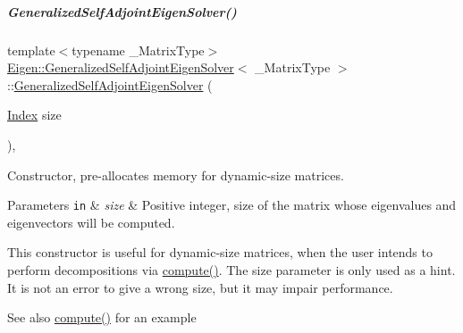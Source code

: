 \mbox{\label{group___eigenvalues___module_aac849f01a8c6148c645acd10bd3a9b0e}} 
\subparagraph{\texorpdfstring{Generalized\+Self\+Adjoint\+Eigen\+Solver()}{GeneralizedSelfAdjointEigenSolver()}\hspace{0.1cm}{\footnotesize\ttfamily [2/6]}}
{\footnotesize\ttfamily template$<$typename \+\_\+\+Matrix\+Type$>$ \\
\hyperlink{group___eigenvalues___module_class_eigen_1_1_generalized_self_adjoint_eigen_solver}{Eigen\+::\+Generalized\+Self\+Adjoint\+Eigen\+Solver}$<$ \+\_\+\+Matrix\+Type $>$\+::\hyperlink{group___eigenvalues___module_class_eigen_1_1_generalized_self_adjoint_eigen_solver}{Generalized\+Self\+Adjoint\+Eigen\+Solver} (\begin{DoxyParamCaption}\item[{\hyperlink{group___eigenvalues___module_a8a59ab7734b6eae2754fd78bc7c3a360}{Index}}]{size }\end{DoxyParamCaption})\hspace{0.3cm}{\ttfamily [inline]}, {\ttfamily [explicit]}}



Constructor, pre-\/allocates memory for dynamic-\/size matrices. 


\begin{DoxyParams}[1]{Parameters}
\mbox{\tt in}  & {\em size} & Positive integer, size of the matrix whose eigenvalues and eigenvectors will be computed.\\
\hline
\end{DoxyParams}
This constructor is useful for dynamic-\/size matrices, when the user intends to perform decompositions via \hyperlink{group___eigenvalues___module_a724764fe196612b752042692156ed023}{compute()}. The {\ttfamily size} parameter is only used as a hint. It is not an error to give a wrong {\ttfamily size}, but it may impair performance.

\begin{DoxySeeAlso}{See also}
\hyperlink{group___eigenvalues___module_a724764fe196612b752042692156ed023}{compute()} for an example 
\end{DoxySeeAlso}


